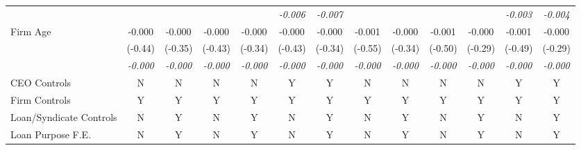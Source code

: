 {\begin{tabular}{l*{12}{c}}
                    &                     &                     &                     &                     &\textit{-0.006}         &\textit{-0.007}         &                     &                     &                     &                     &\textit{-0.003}         &\textit{-0.004}         \\
Firm Age            &      -0.000         &      -0.000         &      -0.000         &      -0.000         &      -0.000         &      -0.000         &      -0.001         &      -0.000         &      -0.001         &      -0.000         &      -0.001         &      -0.000         \\
                    &     (-0.44)         &     (-0.35)         &     (-0.43)         &     (-0.34)         &     (-0.43)         &     (-0.34)         &     (-0.55)         &     (-0.34)         &     (-0.50)         &     (-0.29)         &     (-0.49)         &     (-0.29)         \\
                    &\textit{-0.000}         &\textit{-0.000}         &\textit{-0.000}         &\textit{-0.000}         &\textit{-0.000}         &\textit{-0.000}         &\textit{-0.000}         &\textit{-0.000}         &\textit{-0.000}         &\textit{-0.000}         &\textit{-0.000}         &\textit{-0.000}         \\
\midrule CEO Controls        &           N         &           N         &           N         &           N         &           Y         &           Y         &           N         &           N         &           N         &           N         &           Y         &           Y         \\
Firm Controls       &           Y         &           Y         &           Y         &           Y         &           Y         &           Y         &           Y         &           Y         &           Y         &           Y         &           Y         &           Y         \\
Loan/Syndicate Controls&           N         &           Y         &           N         &           Y         &           N         &           Y         &           N         &           Y         &           N         &           Y         &           N         &           Y         \\
Loan Purpose F.E.   &           N         &           Y         &           N         &           Y         &           N         &           Y         &           N         &           Y         &           N         &           Y         &           N         &           Y         \\

\end{tabular}}
